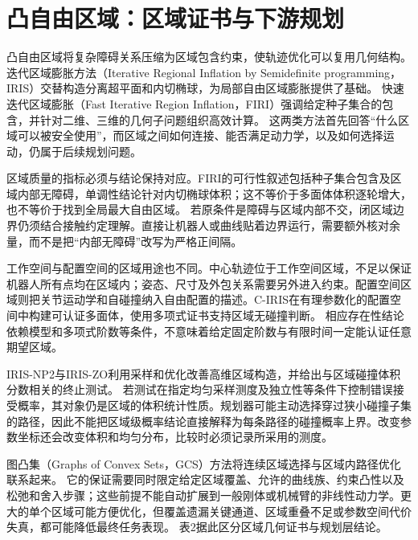 \documentclass{aas}
\begin{document}
\section{凸自由区域：区域证书与下游规划}
凸自由区域将复杂障碍关系压缩为区域包含约束，使轨迹优化可以复用几何结构。迭代区域膨胀方法（Iterative Regional Inflation by Semidefinite programming，IRIS）交替构造分离超平面和内切椭球，为局部自由区域膨胀提供了基础。\cite{R10} 快速迭代区域膨胀（Fast Iterative Region Inflation，FIRI）强调给定种子集合的包含，并针对二维、三维的几何子问题组织高效计算。\cite{R02} 这两类方法首先回答“什么区域可以被安全使用”，而区域之间如何连接、能否满足动力学，以及如何选择运动，仍属于后续规划问题。

区域质量的指标必须与结论保持对应。FIRI的可行性叙述包括种子集合包含及区域内部无障碍，单调性结论针对内切椭球体积；这不等价于多面体体积逐轮增大，也不等价于找到全局最大自由区域。\cite{R02} 若原条件是障碍与区域内部不交，闭区域边界仍须结合接触约定理解。直接让机器人或曲线贴着边界运行，需要额外核对余量，而不是把“内部无障碍”改写为严格正间隔。

工作空间与配置空间的区域用途也不同。中心轨迹位于工作空间区域，不足以保证机器人所有点均在区域内；姿态、尺寸及外包关系需要另外进入约束。配置空间区域则把关节运动学和自碰撞纳入自由配置的描述。C-IRIS在有理参数化的配置空间中构建可认证多面体，使用多项式证书支持区域无碰撞判断。\cite{R11} 相应存在性结论依赖模型和多项式阶数等条件，不意味着给定固定阶数与有限时间一定能认证任意期望区域。

IRIS-NP2与IRIS-ZO利用采样和优化改善高维区域构造，并给出与区域碰撞体积分数相关的终止测试。\cite{R15} 若测试在指定均匀采样测度及独立性等条件下控制错误接受概率，其对象仍是区域的体积统计性质。规划器可能主动选择穿过狭小碰撞子集的路径，因此不能把区域级概率结论直接解释为每条路径的碰撞概率上界。改变参数坐标还会改变体积和均匀分布，比较时必须记录所采用的测度。

图凸集（Graphs of Convex Sets，GCS）方法将连续区域选择与区域内路径优化联系起来。\cite{R12} 它的保证需要同时限定给定区域覆盖、允许的曲线族、约束凸性以及松弛和舍入步骤；这些前提不能自动扩展到一般刚体或机械臂的非线性动力学。更大的单个区域可能方便优化，但覆盖遗漏关键通道、区域重叠不足或参数空间代价失真，都可能降低最终任务表现。\cite{R21} 表2据此区分区域几何证书与规划层结论。
\end{document}
